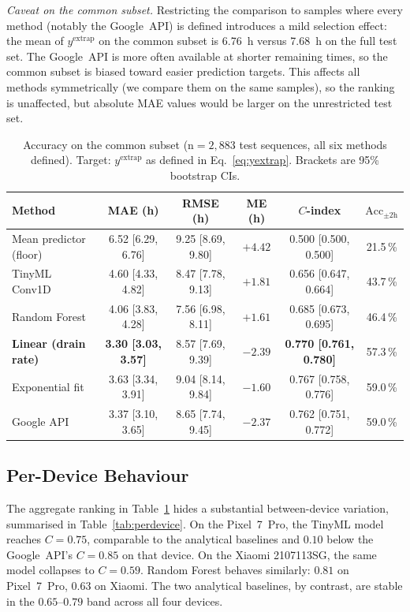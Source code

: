 \documentclass[conference]{IEEEtran}
\begin{document}
\emph{Caveat on the common subset.} Restricting the comparison to
samples where every method (notably the Google~API) is defined
introduces a mild selection effect: the mean of $y^{\text{extrap}}$
on the common subset is \SI{6.76}{\hour} versus \SI{7.68}{\hour} on the
full test set. The Google~API is more often available at shorter
remaining times, so the common subset is biased toward easier
prediction targets. This affects all methods symmetrically (we
compare them on the same samples), so the ranking is unaffected, but
absolute MAE values would be larger on the unrestricted test set.

\begin{table}[t]
\caption{Accuracy on the common subset (n${=}2{,}883$ test sequences,
all six methods defined). Target: $y^{\text{extrap}}$ as defined in
Eq.~\eqref{eq:yextrap}. Brackets are 95\% bootstrap CIs.}
\label{tab:accuracy}
\centering
\small
\begin{tabular}{lccccc}
\toprule
Method & MAE (h) & RMSE (h) & ME (h) & $C$-index & $\text{Acc}_{\pm 2\text{h}}$ \\
\midrule
Mean predictor (floor)  & 6.52 [6.29, 6.76] & 9.25 [8.69, 9.80] & $+4.42$ & 0.500 [0.500, 0.500] & 21.5\,\% \\
TinyML Conv1D           & 4.60 [4.33, 4.82] & 8.47 [7.78, 9.13] & $+1.81$ & 0.656 [0.647, 0.664] & 43.7\,\% \\
Random Forest           & 4.06 [3.83, 4.28] & 7.56 [6.98, 8.11] & $+1.61$ & 0.685 [0.673, 0.695] & 46.4\,\% \\
\textbf{Linear (drain rate)}     & \textbf{3.30 [3.03, 3.57]} & 8.57 [7.69, 9.39] & $-2.39$ & \textbf{0.770 [0.761, 0.780]} & 57.3\,\% \\
Exponential fit         & 3.63 [3.34, 3.91] & 9.04 [8.14, 9.84] & $-1.60$ & 0.767 [0.758, 0.776] & 59.0\,\% \\
Google API              & 3.37 [3.10, 3.65] & 8.65 [7.74, 9.45] & $-2.37$ & 0.762 [0.751, 0.772] & 59.0\,\% \\
\bottomrule
\end{tabular}
\end{table}

\subsection{Per-Device Behaviour}
\label{sec:results-perdevice}
The aggregate ranking in Table~\ref{tab:accuracy} hides a substantial
between-device variation, summarised in Table~\ref{tab:perdevice}. On
the Pixel~7~Pro, the TinyML model reaches $C{=}0.75$, comparable to
the analytical baselines and $0.10$ below the Google~API's
$C{=}0.85$ on that device. On the Xiaomi 2107113SG, the same model
collapses to $C{=}0.59$. Random Forest behaves similarly: $0.81$ on
Pixel~7~Pro, $0.63$ on Xiaomi. The two analytical baselines, by
contrast, are stable in the $0.65$--$0.79$ band across all four
devices.
\end{document}
